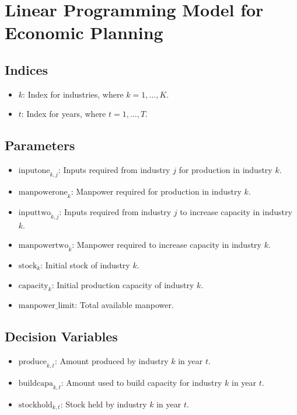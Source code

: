 \documentclass{article}
\begin{document}
\section*{Linear Programming Model for Economic Planning}

\subsection*{Indices}
\begin{itemize}
    \item $k$: Index for industries, where $k = 1, \ldots, K$.
    \item $t$: Index for years, where $t = 1, \ldots, T$.
\end{itemize}

\subsection*{Parameters}
\begin{itemize}
    \item $\text{inputone}_{k, j}$: Inputs required from industry $j$ for production in industry $k$.
    \item $\text{manpowerone}_{k}$: Manpower required for production in industry $k$.
    \item $\text{inputtwo}_{k, j}$: Inputs required from industry $j$ to increase capacity in industry $k$.
    \item $\text{manpowertwo}_{k}$: Manpower required to increase capacity in industry $k$.
    \item $\text{stock}_{k}$: Initial stock of industry $k$.
    \item $\text{capacity}_{k}$: Initial production capacity of industry $k$.
    \item $\text{manpower\_limit}$: Total available manpower.
\end{itemize}

\subsection*{Decision Variables}
\begin{itemize}
    \item $\text{produce}_{k, t}$: Amount produced by industry $k$ in year $t$.
    \item $\text{buildcapa}_{k, t}$: Amount used to build capacity for industry $k$ in year $t$.
    \item $\text{stockhold}_{k, t}$: Stock held by industry $k$ in year $t$.
\end{itemize}
\end{document}
